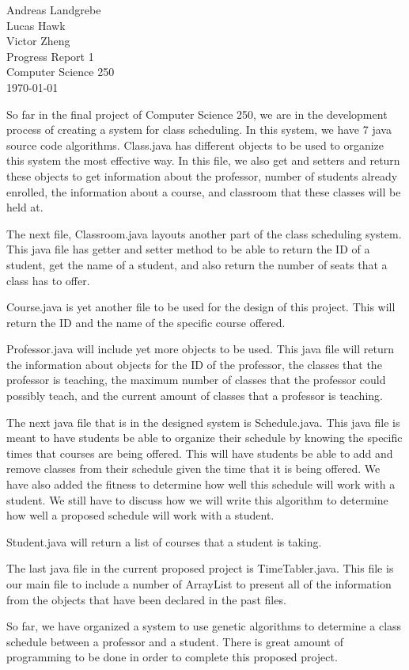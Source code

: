 \documentclass{article}
\begin{document}
\begin{center}
Andreas Landgrebe \\
Lucas Hawk \\
Victor Zheng \\
Progress Report 1 \\
Computer Science 250 \\
\today
\end{center}
\newpage
\doublespacing
\indent
So far in the final project of Computer Science 250, we are in the development process of creating a system for class scheduling. In this system, we have 7 java source code algorithms. Class.java has different objects to be used to organize this system the most effective way. In this file, we also get and setters and return these objects to get information about the professor, number of students already enrolled, the information about a course, and classroom that these classes will be held at.
\par
The next file, Classroom.java layouts another part of the class scheduling system. This java file has getter and setter method to be able to return the ID of a student, get the name of a student, and also return the number of seats that a class has to offer.
\par
Course.java is yet another file to be used for the design of this project. This will return the ID and the name of the specific course offered. 
\par
Professor.java will include yet more objects to be used. This java file will return the information about objects for the ID of the professor, the classes that the professor is teaching, the maximum number of classes that the professor could possibly teach, and the current amount of classes that a professor is teaching.
\par
The next java file that is in the designed system is Schedule.java. This java file is meant to have students be able to organize their schedule by knowing the specific times that courses are being offered. This will have students be able to add and remove classes from their schedule given the time that it is being offered. We have also added the fitness to determine how well this schedule will work with a student. We still have to discuss how we will write this algorithm to determine how well a proposed schedule will work with a student.
\par
Student.java will return a list of courses that a student is taking.
\par
The last java file in the current proposed project is TimeTabler.java. This file is our main file to include a number of ArrayList to present all of the information from the objects that have been declared in the past files.
\par
So far, we have organized a system to use genetic algorithms to determine a class schedule between a professor and a student. There is great amount of programming to be done in order to complete this proposed project.
  
\end{document}
